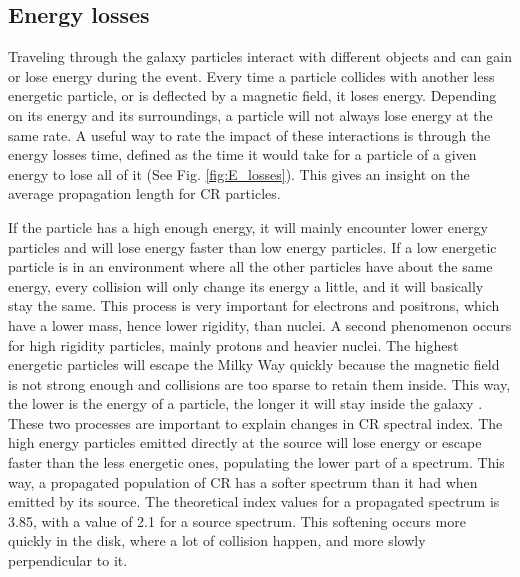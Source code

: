 \subsection{Energy losses}

Traveling through the galaxy particles interact with different objects and can gain or lose energy during the event. Every time a particle collides with another less energetic particle, or is deflected by a magnetic field, it loses energy. Depending on its energy and its surroundings, a particle will not always lose energy at the same rate. A useful way to rate the impact of these interactions is through the energy losses time, defined as the time it would take for a particle of a given energy to lose all of it (See Fig. \ref{fig:E_losses}). This gives an insight on the average propagation length for CR particles.

If the particle has a high enough energy, it will mainly encounter lower energy particles and will lose energy faster than low energy particles. If a low energetic particle is in an environment where all the other particles have about the same energy, every collision will only change its energy a little, and it will basically stay the same. This process is very important for electrons and positrons, which have a lower mass, hence lower rigidity, than nuclei.
A second phenomenon occurs for high rigidity particles, mainly protons and heavier nuclei. The highest energetic particles will escape the Milky Way quickly because the magnetic field is not strong enough and collisions are too sparse to retain them inside. This way, the lower is the energy of a particle, the longer it will stay inside the galaxy \cite{Semikov2015}.
These two processes are important to explain changes in CR spectral index. The high energy particles emitted directly at the source will lose energy or escape faster than the less energetic ones, populating the lower part of a spectrum. This way, a propagated population of CR has a softer spectrum than it had when emitted by its source. The theoretical index values for a propagated spectrum is 3.85, with a value of 2.1 for a source spectrum. \cite{Hillas2005}
This softening occurs more quickly in the disk, where a lot of collision happen, and more slowly perpendicular to it.

